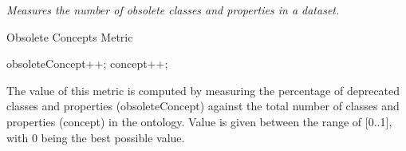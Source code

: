 \begin{mdframed}[style=metricdefinition]
\emph{Measures the number of obsolete classes and properties in a dataset.}
\end{mdframed}

\begin{algorithm}
\caption{Obsolete Concepts Metric}
\begin{algorithmic}[1]
  obsoleteConcept++;  \EndIf 
{}  concept++;   \EndIf 
\EndProcedure
\end{algorithmic}
\end{algorithm}

The value of this metric is computed by measuring the percentage of deprecated classes and properties (obsoleteConcept) against the total number of classes and properties (concept) in the ontology. 
Value is given between the range of [0..1], with 0 being the best possible value.

